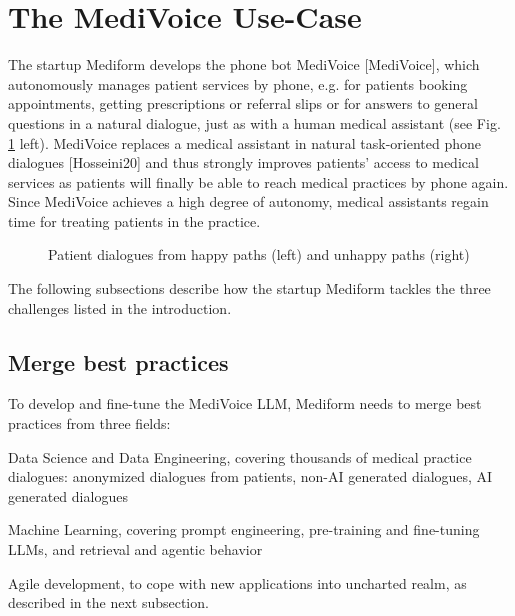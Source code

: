\documentclass[twocolumn]{article}
\begin{document}
\section{The MediVoice Use-Case}
The startup Mediform develops the phone bot MediVoice [MediVoice], which autonomously manages patient services by phone, e.g. for patients booking appointments, getting prescriptions or referral slips or for answers to general questions in a natural dialogue, just as with a human medical assistant (see Fig. \ref{fig:dialogues} left). MediVoice replaces a medical assistant in natural task-oriented phone dialogues  [Hosseini20] and thus strongly improves patients’ access to medical services as patients will finally be able to reach medical practices by phone again.
Since MediVoice achieves a high degree of autonomy, medical assistants regain time for treating patients in the practice. 

\begin{figure}[hbt!]
\begin{center}
\caption{Patient dialogues from happy paths (left) and unhappy paths (right)}
\label{fig:dialogues}
\end{center}
\end{figure}

The following subsections describe how the startup Mediform tackles the three challenges listed in the introduction. 

\subsection{Merge best practices}

To develop and fine-tune the MediVoice LLM, Mediform needs to merge best practices from three fields:
\begin{compactitem}
\item Data Science and Data Engineering, covering thousands of medical practice dialogues: anonymized dialogues from patients, non-AI generated dialogues, AI generated dialogues
\item Machine Learning, covering prompt engineering, pre-training and fine-tuning LLMs, and retrieval and agentic behavior
\item Agile development, to cope with new applications into uncharted realm, as described in the next subsection.
\end{compactitem}
\end{document}
